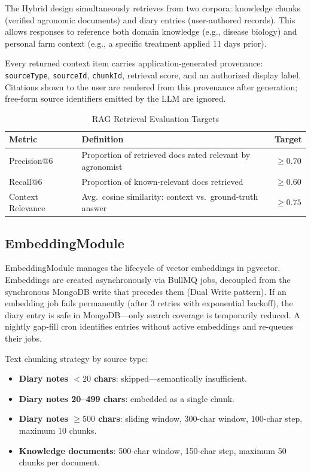 \documentclass[conference]{IEEEtran}
\begin{document}
The Hybrid design simultaneously retrieves from two corpora: knowledge chunks (verified agronomic documents) and diary entries (user-authored records). This allows responses to reference both domain knowledge (e.g., disease biology) and personal farm context (e.g., a specific treatment applied 11 days prior).

Every returned context item carries application-generated provenance: \texttt{sourceType}, \texttt{sourceId}, \texttt{chunkId}, retrieval score, and an authorized display label. Citations shown to the user are rendered from this provenance after generation; free-form source identifiers emitted by the LLM are ignored.

\begin{table}[htbp]
\caption{RAG Retrieval Evaluation Targets}
\label{tab:rag_eval}
\centering
\begin{tabular}{lp{3.2cm}c}
\toprule
\textbf{Metric} & \textbf{Definition} & \textbf{Target} \\
\midrule
Precision@6 & Proportion of retrieved docs rated relevant by agronomist & $\geq 0.70$ \\
Recall@6 & Proportion of known-relevant docs retrieved & $\geq 0.60$ \\
Context Relevance & Avg.\ cosine similarity: context vs.\ ground-truth answer & $\geq 0.75$ \\
\bottomrule
\end{tabular}
\end{table}

\subsection{EmbeddingModule}

EmbeddingModule manages the lifecycle of vector embeddings in pgvector. Embeddings are created asynchronously via BullMQ jobs, decoupled from the synchronous MongoDB write that precedes them (Dual Write pattern). If an embedding job fails permanently (after 3 retries with exponential backoff), the diary entry is safe in MongoDB---only search coverage is temporarily reduced. A nightly gap-fill cron identifies entries without active embeddings and re-queues their jobs.

Text chunking strategy by source type:

\begin{itemize}
    \item \textbf{Diary notes $< 20$ chars}: skipped---semantically insufficient.
    \item \textbf{Diary notes 20--499 chars}: embedded as a single chunk.
    \item \textbf{Diary notes $\geq 500$ chars}: sliding window, 300-char window, 100-char step, maximum 10 chunks.
    \item \textbf{Knowledge documents}: 500-char window, 150-char step, maximum 50 chunks per document.
\end{itemize}
\end{document}

